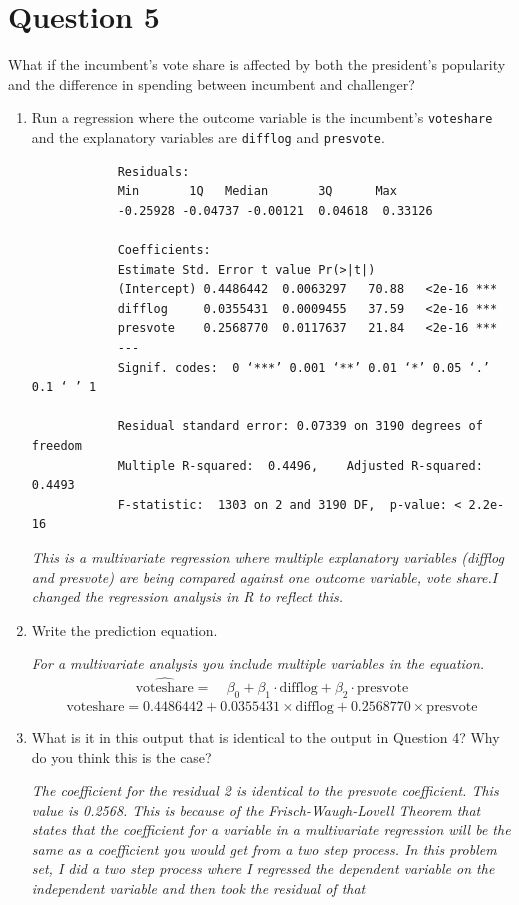 \documentclass[12pt,letterpaper]{article}
\begin{document}
	\newpage	

\section*{Question 5}
\noindent What if the incumbent's vote share is affected by both the president's popularity and the difference in spending between incumbent and challenger? 
	\begin{enumerate}
		\item Run a regression where the outcome variable is the incumbent's \texttt{voteshare} and the explanatory variables are \texttt{difflog} and \texttt{presvote}.
				
			\begin{verbatim}
			Residuals:
			Min       1Q   Median       3Q      Max 
			-0.25928 -0.04737 -0.00121  0.04618  0.33126 
			
			Coefficients:
			Estimate Std. Error t value Pr(>|t|)    
			(Intercept) 0.4486442  0.0063297   70.88   <2e-16 ***
			difflog     0.0355431  0.0009455   37.59   <2e-16 ***
			presvote    0.2568770  0.0117637   21.84   <2e-16 ***
			---
			Signif. codes:  0 ‘***’ 0.001 ‘**’ 0.01 ‘*’ 0.05 ‘.’ 0.1 ‘ ’ 1
			
			Residual standard error: 0.07339 on 3190 degrees of freedom
			Multiple R-squared:  0.4496,	Adjusted R-squared:  0.4493 
			F-statistic:  1303 on 2 and 3190 DF,  p-value: < 2.2e-16
		\end{verbatim}
				\textit{This is a multivariate regression where multiple explanatory variables (difflog and presvote) are being compared against one outcome variable, vote share.I changed the regression analysis in R to reflect this.}
			\vspace{5cm}
		\item Write the prediction equation.
			
		\textit{For a multivariate analysis you include multiple variables in the equation.}
		\begin{equation}
			\begin{aligned}
				\hat{\text{voteshare}} =\ & \beta_0 + \beta_1 \cdot \text{difflog} + \beta_2 \cdot \text{presvote} 
			\end{aligned}
		\end{equation}
		\[
		\text{voteshare} = 0.4486442 + 0.0355431 \times \text{difflog} + 0.2568770 \times \text{presvote}
		\]	\vspace{5cm}
		\item What is it in this output that is identical to the output in Question 4? Why do you think this is the case?
		
			\textit{The coefficient for the residual 2 is identical to the presvote coefficient. This value is 0.2568. This is because of the Frisch-Waugh-Lovell Theorem that states that the coefficient for a variable in a multivariate regression will be the same as a coefficient you would get from a two step process. In this problem set, I did a two step process where I regressed the dependent variable on the independent variable and then took the residual of that  }
	\end{enumerate}
\end{document}
